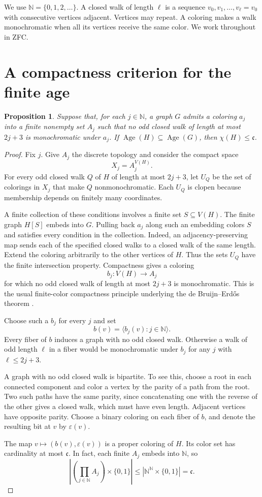 \documentclass[11pt,leqno]{amsart}
\newtheorem{proposition}[theorem]{Proposition}
\theoremstyle{definition}
\numberwithin{equation}{section}
\newcommand{\N}{\mathbb N}
\newcommand{\cc}{\mathfrak c}
\newcommand{\Age}{\operatorname{Age}}
\newcommand{\seq}[1]{\langle #1\rangle}
\newcommand{\sub}{\subseteq}
\begin{document}
We use $\N=\{0,1,2,\ldots\}$. A closed walk of length $\ell$ is a sequence $v_0,v_1,\ldots,v_\ell=v_0$ with consecutive vertices adjacent. Vertices may repeat. A coloring makes a walk monochromatic when all its vertices receive the same color. We work throughout in ZFC.

\section{A compactness criterion for the finite age}

\begin{proposition}\label{prop:compactness}
Suppose that, for each $j\in\N$, a graph $G$ admits a coloring $a_j$ into a finite nonempty set $A_j$ such that no odd closed walk of length at most $2j+3$ is monochromatic under $a_j$. If $\Age(H)\sub\Age(G)$, then $\chi(H)\le\cc$.
\end{proposition}

\begin{proof}
Fix $j$. Give $A_j$ the discrete topology and consider the compact space
\[
X_j=A_j^{V(H)}.
\]
For every odd closed walk $Q$ of $H$ of length at most $2j+3$, let $U_Q$ be the set of colorings in $X_j$ that make $Q$ nonmonochromatic. Each $U_Q$ is clopen because membership depends on finitely many coordinates.

A finite collection of these conditions involves a finite set $S\sub V(H)$. The finite graph $H[S]$ embeds into $G$. Pulling back $a_j$ along such an embedding colors $S$ and satisfies every condition in the collection. Indeed, an adjacency-preserving map sends each of the specified closed walks to a closed walk of the same length. Extend the coloring arbitrarily to the other vertices of $H$. Thus the sets $U_Q$ have the finite intersection property. Compactness gives a coloring
\[
b_j\colon V(H)\longrightarrow A_j
\]
for which no odd closed walk of length at most $2j+3$ is monochromatic. This is the usual finite-color compactness principle underlying the de Bruijn--Erd\H{o}s theorem \cite{debruijn-erdos}.

Choose such a $b_j$ for every $j$ and set
\[
b(v)=\seq{b_j(v):j\in\N}.
\]
Every fiber of $b$ induces a graph with no odd closed walk. Otherwise a walk of odd length $\ell$ in a fiber would be monochromatic under $b_j$ for any $j$ with $\ell\le2j+3$.

A graph with no odd closed walk is bipartite. To see this, choose a root in each connected component and color a vertex by the parity of a path from the root. Two such paths have the same parity, since concatenating one with the reverse of the other gives a closed walk, which must have even length. Adjacent vertices have opposite parity. Choose a binary coloring on each fiber of $b$, and denote the resulting bit at $v$ by $\varepsilon(v)$.

The map $v\mapsto(b(v),\varepsilon(v))$ is a proper coloring of $H$. Its color set has cardinality at most $\cc$. In fact, each finite $A_j$ embeds into $\N$, so
\[
\left|\left(\prod_{j\in\N}A_j\right)\times\{0,1\}\right|
\le |\N^{\N}\times\{0,1\}|=\cc.
\]
\end{proof}
\end{document}
